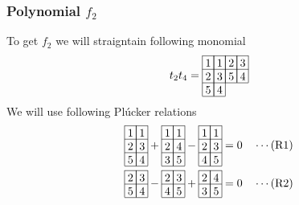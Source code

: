 \subsubsection{Polynomial \(f_2\)}
To get \(f_2\) we will straigntain following monomial
\[
t_2t_4 = 
\begin{array}[c]{*{4}c}\cline{1-4}
\lr{1}&\lr{1}&\lr{2}&\lr{3}\\\cline{1-4}
\lr{2}&\lr{3}&\lr{5}&\lr{4}\\\cline{1-4}
\lr{5}&\lr{4}\\\cline{1-2}
\end{array}
\]
We will use following Pl\'{u}cker relations
\begin{align*}
\begin{array}[c]{*{2}c}\cline{1-2}
\lr{1}&\lr{1}\\\cline{1-2}
\lr{2}&\lr{3}\\\cline{1-2}
\lr{5}&\lr{4}\\\cline{1-2}
\end{array}
+\begin{array}[c]{*{2}c}\cline{1-2}
\lr{1}&\lr{1}\\\cline{1-2}
\lr{2}&\lr{4}\\\cline{1-2}
\lr{3}&\lr{5}\\\cline{1-2}
\end{array}
-\begin{array}[c]{*{2}c}\cline{1-2}
\lr{1}&\lr{1}\\\cline{1-2}
\lr{2}&\lr{3}\\\cline{1-2}
\lr{4}&\lr{5}\\\cline{1-2}
\end{array}
&=0 &&\cdots (\text{R1})\\
\begin{array}[c]{*{2}c}\cline{1-2}
\lr{2}&\lr{3}\\\cline{1-2}
\lr{5}&\lr{4}\\\cline{1-2}
\end{array}
-\begin{array}[c]{*{2}c}\cline{1-2}
\lr{2}&\lr{3}\\\cline{1-2}
\lr{4}&\lr{5}\\\cline{1-2}
\end{array}
+\begin{array}[c]{*{2}c}\cline{1-2}
\lr{2}&\lr{4}\\\cline{1-2}
\lr{3}&\lr{5}\\\cline{1-2}
\end{array}
&=0 &&\cdots (\text{R2})\\

\end{align*}
